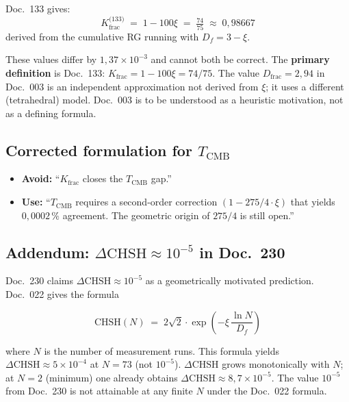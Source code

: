 Doc.~133 gives:
\begin{equation}
  K_\text{frac}^\text{(133)} \;=\; 1 - 100\xi \;=\; \tfrac{74}{75}
  \;\approx\; 0{,}98667
  \tag{190.19}
\end{equation}
derived from the cumulative RG running with $D_f = 3 - \xi$.

These values differ by $1{,}37 \times 10^{-3}$ and cannot both be correct. The
\textbf{primary definition} is Doc.~133: $K_\text{frac} = 1 - 100\xi = 74/75$.
The value $D_\text{frac} = 2{,}94$ in Doc.~003 is an independent approximation
not derived from $\xi$; it uses a different (tetrahedral) model. Doc.~003 is to
be understood as a heuristic motivation, not as a defining formula.

\subsection*{Corrected formulation for $T_\text{CMB}$}

\begin{itemize}
  \item \textbf{Avoid:} \enquote{$K_\text{frac}$ closes the $T_\text{CMB}$
        gap.}
  \item \textbf{Use:} \enquote{$T_\text{CMB}$ requires a second-order
        correction $(1 - 275/4\cdot\xi)$ that yields $0{,}0002\,\%$ agreement.
        The geometric origin of $275/4$ is still open.}
\end{itemize}

\subsection*{Addendum: $\Delta\text{CHSH} \approx 10^{-5}$ in Doc.~230}

Doc.~230 claims $\Delta\text{CHSH} \approx 10^{-5}$ as a geometrically
motivated prediction. Doc.~022 gives the formula

\begin{equation}
  \text{CHSH}(N) \;=\; 2\sqrt{2}\cdot\exp\!\left(-\xi\,\frac{\ln N}{D_f}\right)
  \tag{190.20}
\end{equation}

where $N$ is the number of measurement runs. This formula yields
$\Delta\text{CHSH} \approx 5\times10^{-4}$ at $N=73$ (not $10^{-5}$).
$\Delta\text{CHSH}$ grows monotonically with $N$; at $N=2$ (minimum) one
already obtains $\Delta\text{CHSH} \approx 8{,}7\times10^{-5}$. The value
$10^{-5}$ from Doc.~230 is not attainable at any finite $N$ under the Doc.~022
formula.

